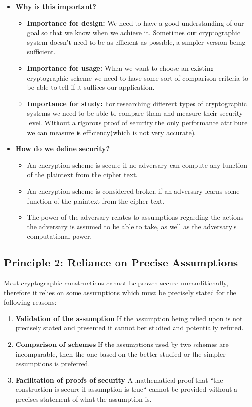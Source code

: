 \begin{itemize}
    \item \textbf{Why is this important?}
    \begin{itemize}
        \item \textbf{Importance for design:} We need to have a good understanding of our goal so that
we know when we achieve it. Sometimes our cryptographic system doesn't need to
be as efficient as possible, a simpler version being sufficient.
        \item \textbf{Importance for usage:} When we want to choose an existing cryptographic scheme
we need to have some sort of comparison criteria to be able to tell if it suffices our
application.
        \item \textbf{Importance for study:} For researching different types of cryptographic systems
we need to be able to compare them and measure their security level. Without
a rigorous proof of security the only performance attribute we can measure is
efficiency(which is not very accurate).
    \end{itemize}
    \item \textbf{How do we define security?}
    \begin{itemize}
        \item \textcolor{R}{An encryption scheme is secure if no adversary can compute any function of the
plaintext from the cipher text.}
        \item \textcolor{B}{An encryption scheme is considered broken if an adversary learns some function of
the plaintext from the cipher text.}
        \item \textcolor{G}{The power of the adversary relates to assumptions regarding the actions the
adversary is assumed to be able to take, as well as the adversary`s computational
power.}
    \end{itemize}
\end{itemize}

\subsection{Principle 2: Reliance on Precise Assumptions}

Most cryptographic constructions cannot be proven secure unconditionally, therefore it relies on some assumptions which must be precisely stated for the following reasons:

\begin{enumerate}
\item \textbf{Validation of the assumption} If the assumption being relied upon is not precisely stated and presented it cannot ber studied and potentially refuted.
\item \textbf{Comparison of schemes} If the assumptions used by two schemes are incomparable, then the one based on the better-studied or the simpler assumptions is preferred.
\item \textbf{Facilitation of proofs of security} A mathematical proof that ``the construction is secure if assumption is true`` cannot be provided without a precises statement of what the assumption is.
\end{enumerate}

